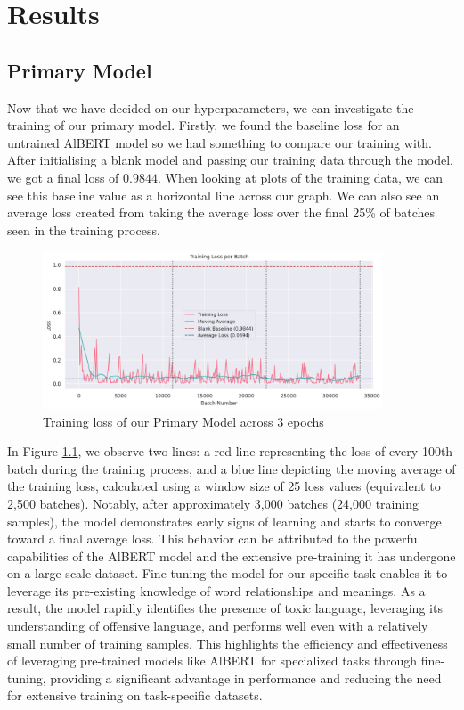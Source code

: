 \chapter{Results}

\section{Primary Model}

Now that we have decided on our hyperparameters, we can investigate the training of our primary model. Firstly, we found the baseline loss for an untrained AlBERT model so we had something to compare our training with. After initialising a blank model and passing our training data through the model, we got a final loss of $0.9844$. When looking at plots of the training data, we can see this baseline value as a horizontal line across our graph. We can also see an average loss created from taking the average loss over the final 25\% of batches seen in the training process.

\begin{figure}[H]
    \centering
    \includegraphics[width=0.9\textwidth]{graphs/training/accumulated_grad_batch/agb-10_training_loss.png}
    \caption{Training loss of our Primary Model across 3 epochs}
    \label{fig:agb_10_train}
\end{figure}

In Figure \ref{fig:agb_10_train}, we observe two lines: a red line representing the loss of every 100th batch during the training process, and a blue line depicting the moving average of the training loss, calculated using a window size of 25 loss values (equivalent to 2,500 batches). Notably, after approximately 3,000 batches (24,000 training samples), the model demonstrates early signs of learning and starts to converge toward a final average loss. This behavior can be attributed to the powerful capabilities of the AlBERT model and the extensive pre-training it has undergone on a large-scale dataset. Fine-tuning the model for our specific task enables it to leverage its pre-existing knowledge of word relationships and meanings. As a result, the model rapidly identifies the presence of toxic language, leveraging its understanding of offensive language, and performs well even with a relatively small number of training samples. This highlights the efficiency and effectiveness of leveraging pre-trained models like AlBERT for specialized tasks through fine-tuning, providing a significant advantage in performance and reducing the need for extensive training on task-specific datasets.

